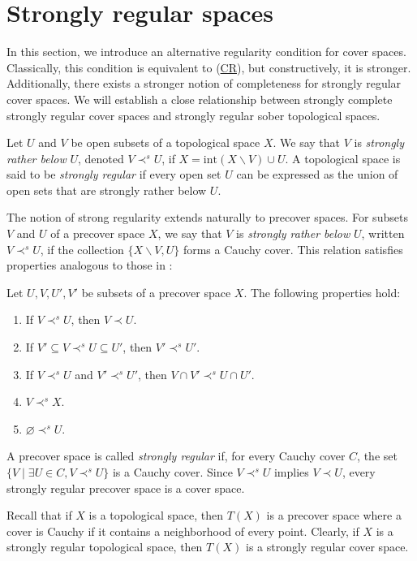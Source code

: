 \documentclass[reqno]{amsart}
\newcommand{\axref}[1]{(\hyperref[ax:#1]{#1})}
\theoremstyle{definition}
\theoremstyle{remark}
\numberwithin{figure}{section}
\newcommand{\rb}{\prec}
\begin{document}
\section{Strongly regular spaces}
\label{sec:strongly-regular}

In this section, we introduce an alternative regularity condition for cover spaces.
Classically, this condition is equivalent to \axref{CR}, but constructively, it is stronger.
Additionally, there exists a stronger notion of completeness for strongly regular cover spaces.
We will establish a close relationship between strongly complete strongly regular cover spaces and strongly regular sober topological spaces.

Let $U$ and $V$ be open subsets of a topological space $X$. We say that $V$ is \emph{strongly rather below} $U$, denoted $V \rb^s U$, if $X = \mathrm{int}(X \backslash V) \cup U$.
A topological space is said to be \emph{strongly regular} if every open set $U$ can be expressed as the union of open sets that are strongly rather below $U$.

The notion of strong regularity extends naturally to precover spaces.
For subsets $V$ and $U$ of a precover space $X$, we say that $V$ is \emph{strongly rather below} $U$, written $V \rb^s U$, if the collection $\{ X \backslash V, U \}$ forms a Cauchy cover.
This relation satisfies properties analogous to those in :

\begin{prop}
Let $U,V,U',V'$ be subsets of a precover space $X$. The following properties hold:
\begin{enumerate}
\item If $V \rb^s U$, then $V \rb U$.
\item If $V' \subseteq V \rb^s U \subseteq U'$, then $V' \rb^s U'$.
\item If $V \rb^s U$ and $V' \rb^s U'$, then $V \cap V' \rb^s U \cap U'$.
\item $V \rb^s X$.
\item $\varnothing \rb^s U$.
\end{enumerate}
\end{prop}

A precover space is called \emph{strongly regular} if, for every Cauchy cover $C$, the set $\{ V \mid \exists U \in C, V \rb^s U \}$ is a Cauchy cover.
Since $V \rb^s U$ implies $V \rb U$, every strongly regular precover space is a cover space.

\begin{example}
Recall that if $X$ is a topological space, then $T(X)$ is a precover space where a cover is Cauchy if it contains a neighborhood of every point.
Clearly, if $X$ is a strongly regular topological space, then $T(X)$ is a strongly regular cover space.
\end{example}
\end{document}
